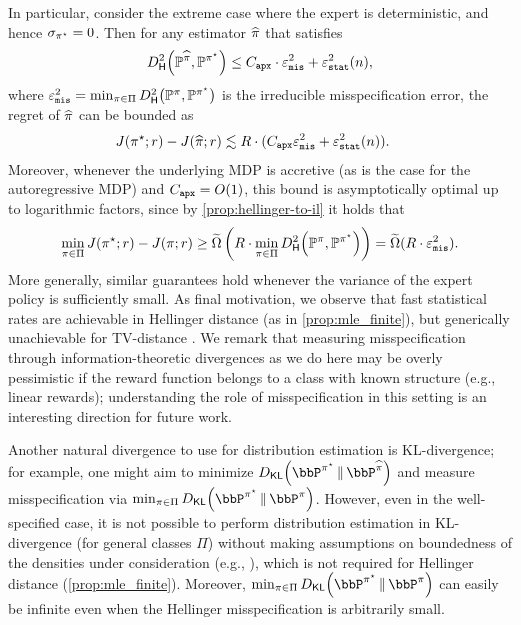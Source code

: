 In particular, consider the extreme case where the expert is deterministic, and hence $\sigma_{\pi^{\star}} = 0$. Then for any estimator $\widehat{\pi}$ that satisfies 
\[\Dhels{\BP^{\pihat}}{\BP^{\pistar}} \leq \Capx \cdot \vepsmis^2 + \vepsstat^2(n),\]
where $\vepsmis^2 = \min_{\pi\in\Pi} \Dhels{\BP^\pi}{\BP^{\pistar}}$ is the irreducible misspecification error, the regret of $\widehat{\pi}$ can be bounded as
\begin{align}
J(\pi^{\star};r)-J(\widehat{\pi};r) &\lesssim R \cdot (C_{\texttt{apx}} \varepsilon_{\texttt{mis}}^2 + \varepsilon_{\texttt{stat}}^2(n)).
\end{align}
Moreover, whenever the underlying MDP is accretive (as is the case for the autoregressive MDP) and $C_{\texttt{apx}} = O(1)$, this bound is asymptotically optimal up to logarithmic factors, since by \cref{prop:hellinger-to-il} it holds that
\[\min_{\pi\in\Pi} J(\pistar;r)-J(\pi;r) \geq \bigomt\left(R \cdot \min_{\pi\in\Pi} \Dhels{\BP^\pi}{\BP^{\pistar}}\right) = \bigomt(R \cdot \vepsmis^2).\]
More generally, similar guarantees hold whenever the variance of the
expert policy is sufficiently small. As final motivation, we observe
that fast statistical rates are achievable in Hellinger distance (as
in \cref{prop:mle_finite}), but generically unachievable for
TV-distance \citep{han2015minimax}. We remark that measuring
  misspecification through information-theoretic divergences as we do
  here may be overly pessimistic if the reward function belongs to a
  class with known structure (e.g., linear rewards); understanding
  the role of misspecification in this setting is an interesting
  direction for future work.\loose
  


\begin{remark}[KL-Divergence]
  Another natural divergence to use for distribution estimation is
  KL-divergence; for example, one might aim to minimize
  $\Dkl{\bbP^{\pistar}}{\bbP^{\pihat}}$ and measure misspecification
  via $\min_{\pi\in\Pi}\Dkl{\bbP^{\pistar}}{\bbP^{\pi}}$. However,
  even in the well-specified case, it is not possible to perform
  distribution estimation in KL-divergence (for general classes $\Pi$)
  without making assumptions on boundedness of the densities under
  consideration (e.g., \citet{bilodeau2021minimax}), which is not required for Hellinger distance
  (\cref{prop:mle_finite}). Moreover, $\min_{\pi\in\Pi}\Dkl{\bbP^{\pistar}}{\bbP^{\pi}}$ can easily be infinite even when the Hellinger misspecification is arbitrarily small.
\end{remark}


